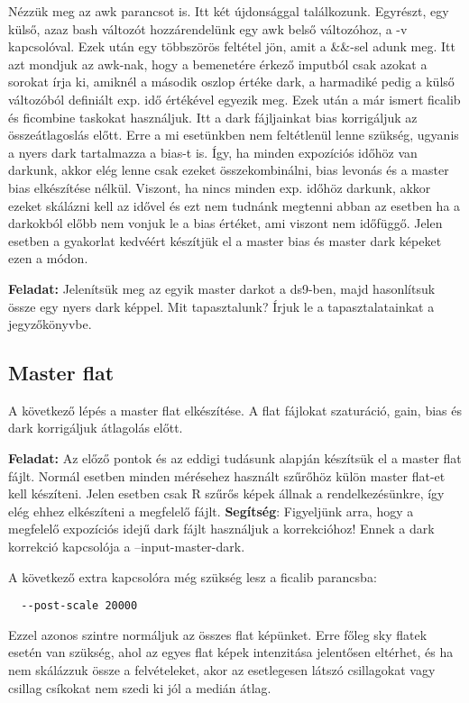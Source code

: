 \documentclass{article}
\begin{document}
Nézzük meg az awk parancsot is. Itt két újdonsággal találkozunk. Egyrészt, egy
külső, azaz bash változót hozzárendelünk egy awk belső változóhoz, a -v
kapcsolóval. Ezek után egy többszörös feltétel jön, amit a \&\&-sel adunk meg.
Itt azt mondjuk az awk-nak, hogy a bemenetére érkező imputból csak azokat a
sorokat írja ki, amiknél a második oszlop értéke dark, a harmadiké pedig a külső
változóból definiált exp. idő értékével egyezik meg.
Ezek után a már ismert ficalib és ficombine taskokat használjuk. Itt a dark
fájljainkat bias korrigáljuk az összeátlagoslás előtt. Erre a mi esetünkben nem
feltétlenül lenne szükség, ugyanis a nyers dark tartalmazza a bias-t is. Így, ha
minden expozíciós időhöz van darkunk, akkor elég lenne csak ezeket
összekombinálni, bias levonás és a master bias elkészítése nélkül. Viszont, ha
nincs minden exp. időhöz darkunk, akkor ezeket skálázni kell az idővel és ezt
nem tudnánk megtenni abban az esetben ha a darkokból előbb nem vonjuk le a bias
értéket, ami viszont nem időfüggő. Jelen esetben a gyakorlat kedvéért készítjük
el a master bias és master dark képeket ezen a módon.

{\bf Feladat:}
Jelenítsük meg az egyik master darkot a ds9-ben, majd hasonlítsuk össze egy
nyers dark képpel. Mit tapasztalunk? Írjuk le a tapasztalatainkat a
jegyzőkönyvbe.

\subsection{Master flat}

A következő lépés a master flat elkészítése. A flat fájlokat szaturáció, gain,
bias és dark korrigáljuk átlagolás előtt.

{\bf Feladat:}
Az előző pontok és az eddigi tudásunk alapján készítsük el a master flat fájlt.
Normál esetben minden mérésehez használt szűrőhöz külön master flat-et kell
készíteni. Jelen esetben csak R szűrős képek állnak a rendelkezésünkre, így elég
ehhez elkészíteni a megfelelő fájlt.
{\bf Segítség}:
Figyeljünk arra, hogy a megfelelő expozíciós idejű dark fájlt használjuk a
korrekcióhoz! Ennek a dark korrekció kapcsolója a --input-master-dark.

A következő extra kapcsolóra még szükség lesz a ficalib parancsba:
\begin{verbatim}
  --post-scale 20000
\end{verbatim}
Ezzel azonos szintre normáljuk az összes flat képünket. Erre főleg sky flatek
esetén van szükség, ahol az egyes flat képek intenzitása jelentősen eltérhet,
és ha nem skálázzuk össze a felvételeket, akor az esetlegesen látszó csillagokat
vagy csillag csíkokat nem szedi ki jól a medián átlag.
\end{document}
